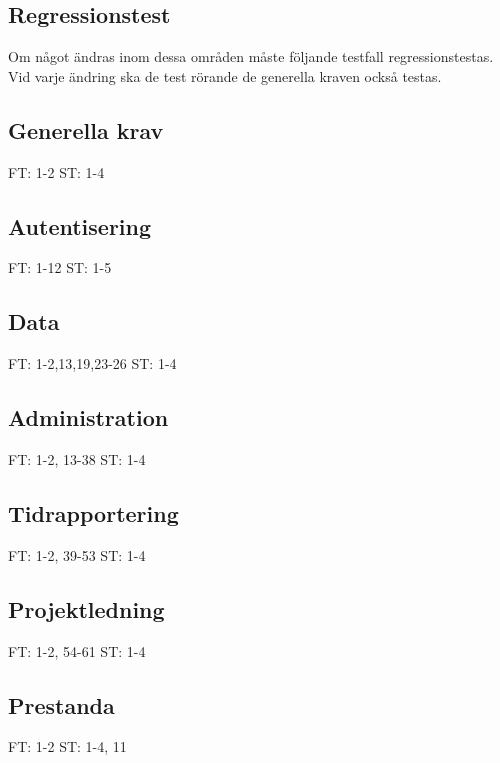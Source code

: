 \documentclass[a4paper]{article}
\begin{document}
\newpage

\begin{appendices}

\section{Regressionstest}

Om något ändras inom dessa områden måste följande testfall regressionstestas. Vid varje ändring ska de test rörande de generella kraven också testas.

\subsection{Generella krav}

FT: 1-2
ST: 1-4

\subsection{Autentisering}

FT: 1-12
ST: 1-5

\subsection{Data}

FT: 1-2,13,19,23-26
ST: 1-4

\subsection{Administration}

FT: 1-2, 13-38
ST: 1-4

\subsection{Tidrapportering}

FT: 1-2, 39-53
ST: 1-4

\subsection{Projektledning}

FT: 1-2, 54-61
ST: 1-4

\subsection{Prestanda}

FT: 1-2
ST: 1-4, 11


\end{appendices}
\end{document}
